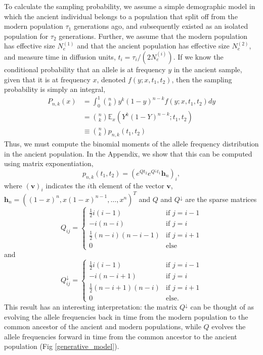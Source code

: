 \documentclass[11pt, oneside]{article}   	%
\begin{document}
To calculate the sampling probability, we assume a simple demographic model in which the ancient individual belongs to a population that split off from the modern population $\tau_1$ generations ago, and subsequently existed as an isolated population for $\tau_2$ generations. Further, we assume that the modern population has effective size $N_e^{(1)}$ and that the ancient population has effective size $N_e^{(2)}$, and measure time in diffusion units, $t_i = \tau_i/(2N_e^{(i)})$. If we know the conditional probability that an allele is at frequency $y$ in the ancient sample, given that it is at frequency $x$, denoted $f(y; x, t_1, t_2)$, then the sampling probability is simply an integral,
\begin{align}
P_{n,k}(x) &= \int_0^1 \binom{n}{k}y^k(1-y)^{n-k}f(y; x, t_1, t_2)dy \nonumber \\
&= \binom{n}{k}\mathbb{E}_x\left(Y^k(1-Y)^{n-k}; t_1, t_2 \right) \nonumber \\
&\equiv \binom{n}{k}p_{n,k}(t_1,t_2)
\end{align}
Thus, we must compute the binomial moments of the allele frequency distribution in the ancient population. In the Appendix, we show that this can be computed using matrix exponentiation, 
\begin{equation}
p_{n,k}(t_1,t_2) = \left(e^{Q t_2}e^{Q^\downarrow t_1}\mathbf{h}_n \right)_i,
\label{expectation_matrices}
\end{equation}
where $(\mathbf{v})_i$ indicates the $i$th element of the vector $\mathbf{v}$, $\mathbf{h}_n = ((1-x)^n, x(1-x)^{n-1},\ldots, x^n)^T$ and $Q$ and $Q^\downarrow$ are the sparse matrices
\[
Q_{ij} = \begin{cases}
\frac{1}{2}i(i-1) & \text{if } j = i - 1 \\
-i(n-i) & \text{if } j = i \\
\frac{1}{2}(n-i)(n-i-1) & \text{if } j = i + 1 \\
0 & \text{else}
\end{cases}
\]
and
\[
Q^\downarrow_{ij} = \begin{cases}
\frac{1}{2}i(i-1) & \text{if } j = i -1 \\
-i(n-i+1) & \text{if } j = i \\
\frac{1}{2}(n-i+1)(n-i) &\text{if } j = i + 1 \\
0 & \text{else}.
\end{cases}
\]
This result has an interesting interpretation: the matrix $Q^\downarrow$ can be thought of as evolving the allele frequencies back in time from the modern population to the common ancestor of the ancient and modern populations, while $Q$ evolves the allele frequencies forward in time from the common ancestor to the ancient population (Fig \ref{generative_model}).
\end{document}
